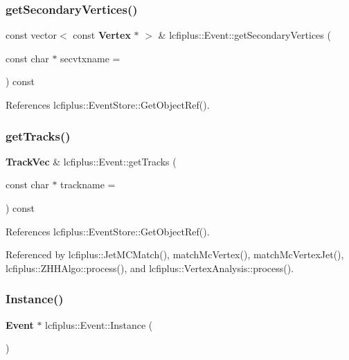 \subsubsection{get\+Secondary\+Vertices()}
{\footnotesize\ttfamily const vector$<$ const \textbf{ Vertex} $\ast$ $>$ \& lcfiplus\+::\+Event\+::get\+Secondary\+Vertices (\begin{DoxyParamCaption}\item[{const char $\ast$}]{secvtxname = {} }\end{DoxyParamCaption}) const}



References lcfiplus\+::\+Event\+Store\+::\+Get\+Object\+Ref().

\mbox{\label{classlcfiplus_1_1Event_a0f46a9a7a97efe6ef8d07aae7cf86a4b}} 
\subsubsection{get\+Tracks()}
{\footnotesize\ttfamily \textbf{ Track\+Vec} \& lcfiplus\+::\+Event\+::get\+Tracks (\begin{DoxyParamCaption}\item[{const char $\ast$}]{trackname = {} }\end{DoxyParamCaption}) const}



References lcfiplus\+::\+Event\+Store\+::\+Get\+Object\+Ref().



Referenced by lcfiplus\+::\+Jet\+M\+C\+Match(), match\+Mc\+Vertex(), match\+Mc\+Vertex\+Jet(), lcfiplus\+::\+Z\+H\+H\+Algo\+::process(), and lcfiplus\+::\+Vertex\+Analysis\+::process().

\mbox{\label{classlcfiplus_1_1Event_a2b3279db0def68be064f2b7b6752b74b}} 
\subsubsection{Instance()}
{\footnotesize\ttfamily \textbf{ Event} $\ast$ lcfiplus\+::\+Event\+::\+Instance (\begin{DoxyParamCaption}{ }\end{DoxyParamCaption})\hspace{0.3cm}{\ttfamily [static]}}



